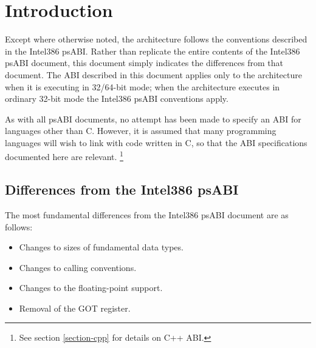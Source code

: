 \chapter{Introduction}

Except where otherwise noted, the \xARCH architecture follows the
conventions described in the Intel386 psABI.  Rather than replicate
the entire contents of the Intel386 psABI document, this document
simply indicates the differences from that document.  The ABI
described in this document applies only to the \xARCH architecture
when it is executing in 32/64-bit mode; when the architecture executes
in ordinary 32-bit mode the Intel386 psABI conventions apply.

As with all psABI documents, no attempt has been made to specify an
ABI for languages other than C.  However, it is assumed that many
programming languages will wish to link with code written in C, so
that the ABI specifications documented here are relevant.%
\footnote{See section \ref{section-cpp} for details on C++ ABI.}

\section{Differences from the Intel386 psABI}

The most fundamental differences from the Intel386 psABI document
are as follows:
\begin{itemize}
\item Changes to sizes of fundamental data types.
\item Changes to calling conventions.
\item Changes to the floating-point support.
\item Removal of the GOT register.
\end{itemize}

